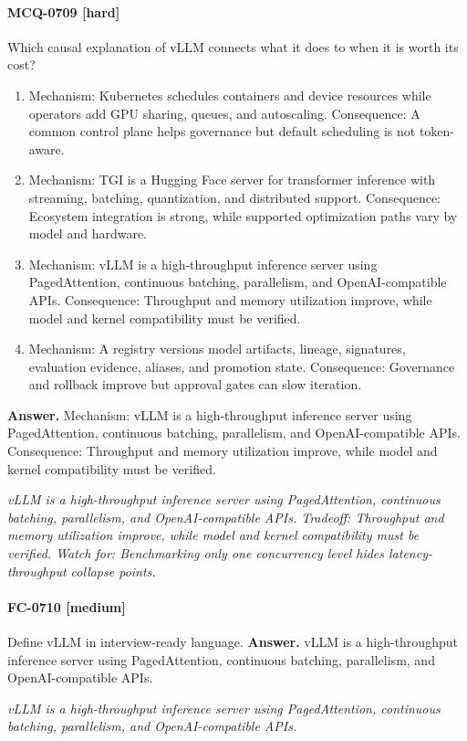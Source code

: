 \paragraph{MCQ-0709 [hard]} Which causal explanation of vLLM connects what it does to when it is worth its cost?
\begin{enumerate}[label=\Alph*.]
\item Mechanism: Kubernetes schedules containers and device resources while operators add GPU sharing, queues, and autoscaling. Consequence: A common control plane helps governance but default scheduling is not token-aware.
\item Mechanism: TGI is a Hugging Face server for transformer inference with streaming, batching, quantization, and distributed support. Consequence: Ecosystem integration is strong, while supported optimization paths vary by model and hardware.
\item Mechanism: vLLM is a high-throughput inference server using PagedAttention, continuous batching, parallelism, and OpenAI-compatible APIs. Consequence: Throughput and memory utilization improve, while model and kernel compatibility must be verified.
\item Mechanism: A registry versions model artifacts, lineage, signatures, evaluation evidence, aliases, and promotion state. Consequence: Governance and rollback improve but approval gates can slow iteration.
\end{enumerate}
\noindent\textbf{Answer.} Mechanism: vLLM is a high-throughput inference server using PagedAttention, continuous batching, parallelism, and OpenAI-compatible APIs. Consequence: Throughput and memory utilization improve, while model and kernel compatibility must be verified.
\par\textit{vLLM is a high-throughput inference server using PagedAttention, continuous batching, parallelism, and OpenAI-compatible APIs. Tradeoff: Throughput and memory utilization improve, while model and kernel compatibility must be verified. Watch for: Benchmarking only one concurrency level hides latency-throughput collapse points.}
\paragraph{FC-0710 [medium]} Define vLLM in interview-ready language.
\noindent\textbf{Answer.} vLLM is a high-throughput inference server using PagedAttention, continuous batching, parallelism, and OpenAI-compatible APIs.
\par\textit{vLLM is a high-throughput inference server using PagedAttention, continuous batching, parallelism, and OpenAI-compatible APIs.}
